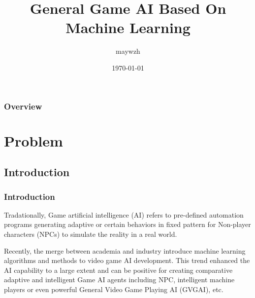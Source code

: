\documentclass{beamer}
\title[GAI based on ML]{General Game AI Based On Machine Learning} %
\author{maywzh} %
\institute[JI] %
{
CCNU-UOW JI \\ %
\medskip
\textit{maywzh@gmail.com} %
}
\date{\today} %
\begin{document}
\begin{frame}
\titlepage %
\end{frame}

\begin{frame}
\frametitle{Overview} %
\tableofcontents %
\end{frame}


\section{Problem} %

\subsection{Introduction} %

\begin{frame}
\frametitle{Introduction}
Tradationally, Game artificial intelligence (AI) refers to pre-defined automation programs generating adaptive or certain behaviors in fixed pattern for Non-player characters (NPCs) to simulate the reality in a real world.\cite{1}

Recently, the merge between academia and industry introduce machine learning algorithms and methods to video game AI development.\cite{2} This trend enhanced the AI capability to a large extent and can be positive for creating comparative adaptive and intelligent Game AI agents including NPC, intelligent machine players or even powerful General Video Game Playing AI (GVGAI), etc. 
\end{frame}
\end{document}
